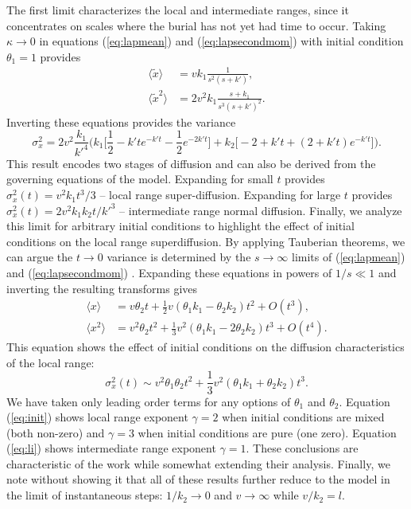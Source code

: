 \documentclass[]{agujournal2018}
\newcommand\be{\begin{equation}}
\newcommand\ee{\end{equation}}
\newcommand\bra{\langle}
\newcommand\ket{\rangle}
\begin{document}
The first limit characterizes the local and intermediate ranges, since it concentrates on scales where the burial has not yet had time to occur. 
Taking $\kappa \rightarrow 0$ in equations (\ref{eq:lapmean}) and (\ref{eq:lapsecondmom}) with initial condition $\theta_1=1$ provides
\begin{align}
\bra \tilde{x} \ket &= vk_1 \frac{1 }{s^2(s+k')}, \label{eq:li1}\\
\bra \tilde{x}^2 \ket &= 2v^2k_1 \frac{s+k_1}{s^3(s+k')^2}. \label{eq:li2}
\end{align}
Inverting these equations provides the variance
\be \sigma_x^2 = 2v^2\frac{k_1}{k'^4}\Big(k_1\big[\frac{1}{2} - k'te^{-k't} - \frac{1}{2} e^{-2k't}\big] + k_2\big[-2+k't + (2+k't)e^{-k't}\big]\Big).\label{eq:li}\ee
This result encodes two stages of diffusion and can also be derived from the governing equations of the \citet{Lisle1998} model.
Expanding for small $t$ provides $\sigma_x^2(t) = v^2k_1t^3/3$ -- local range super-diffusion.
Expanding for large $t$ provides $\sigma_x^2(t) = 2v^2k_1k_2t/k'^3$ -- intermediate range normal diffusion.
Finally, we analyze this limit for arbitrary initial conditions to highlight the effect of initial conditions on the local range superdiffusion.
By applying Tauberian theorems, we can argue the $ t \rightarrow 0$ variance is determined by the $s\rightarrow \infty$ limits of (\ref{eq:lapmean}) and (\ref{eq:lapsecondmom}) \citep[e.g.][]{Weiss1994, Weeks1998}.  Expanding these equations in powers of $1/s \ll 1$ and inverting the resulting transforms gives
\begin{align} \bra x \ket &= v \theta_2 t + \frac{1}{2}v(\theta_1k_1-\theta_2k_2)t^2 + O(t^3),\\
\bra x^2 \ket &= v^2\theta_2 t^2 + \frac{1}{3}v^2(\theta_1k_1-2\theta_2k_2)t^3+ O(t^4).
\end{align}
This equation shows the effect of initial conditions on the diffusion characteristics of the local range:
\be \sigma_x^2(t) \sim v^2\theta_1\theta_2t^2 + \frac{1}{3}v^2(\theta_1k_1+\theta_2k_2)t^3.\label{eq:init}\ee
We have taken only leading order terms for any options of $\theta_1$ and $\theta_2$.
Equation (\ref{eq:init}) shows local range exponent $\gamma=2$ when initial conditions are mixed (both non-zero) and $\gamma=3$ when initial conditions are pure (one zero). Equation (\ref{eq:li}) shows intermediate range exponent $\gamma=1$.
These conclusions are characteristic of the \citet{Lisle1998} work while somewhat extending their analysis.
Finally, we note without showing it that all of these results further reduce to the \citet{Einstein1937} model in the limit of instantaneous steps: $1/k_2 \rightarrow 0$ and $v\rightarrow \infty$ while $v/k_2 = l$.
\end{document}

